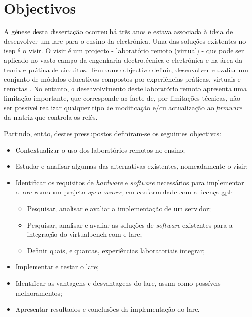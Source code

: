 \section{Objectivos}
\label{sec:Objectivos}
A génese desta dissertação ocorreu há três anos e estava associada à ideia de desenvolver um \acrfull{lare} para o ensino da electrónica. Uma das soluções existentes no \acrfull{isep} é o \acrfull{visir}.
O \acrshort{visir} é um projecto - laboratório remoto (virtual) - que pode ser aplicado no vasto campo da engenharia electrotécnica e electrónica e na área da teoria e prática de circuitos. Tem como objectivo definir, desenvolver e avaliar um conjunto de módulos educativos compostos por experiências práticas, virtuais e remotas \cite{visirisep}.
No entanto, o desenvolvimento deste laboratório remoto apresenta uma limitação importante, que corresponde ao facto de, por limitações técnicas, não ser possível realizar qualquer tipo de modificação e/ou actualização ao \textit{firmware} da matriz que controla os relés.

Partindo, então, destes pressupostos definiram-se os seguintes objectivos:
\begin{itemize}
    \item Contextualizar o uso dos laboratórios remotos no ensino;
    \item Estudar e analisar algumas das alternativas existentes, nomeadamente o \acrshort{visir};
    \item Identificar os requisitos de \textit{hardware} e \textit{software} necessários para implementar o \acrshort{lare} como um projeto \textit{open-source}, em conformidade com a licença \acrfull{gpl}:
    \begin{itemize}
        \item Pesquisar, analisar e avaliar a implementação de um servidor;
        \item Pesquisar, analisar e avaliar as soluções de \textit{software} existentes para a integração do \acrfull{virtualbench} com o \acrshort{lare};
         \item Definir quais, e quantas, experiências laboratoriais integrar;
    \end{itemize}
    \item Implementar e testar o \acrshort{lare};
    \item Identificar as vantagens e desvantagens do \acrshort{lare}, assim como possíveis melhoramentos;
    \item Apresentar resultados e conclusões da implementação do \acrshort{lare}.
\end{itemize}

